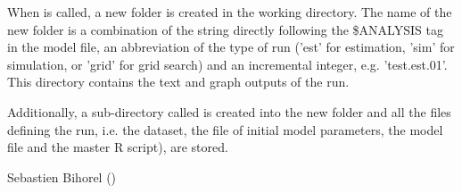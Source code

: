 %
\begin{Value}
When  is called, a new folder is created in the 
working directory. The name of the new folder is a combination of the string
directly following the \$ANALYSIS tag in the model file, an abbreviation of the
type of run ('est' for estimation, 'sim' for simulation, or 'grid' for grid 
search) and an incremental integer, e.g. 'test.est.01'. This directory 
contains the text and graph outputs of the run.

Additionally, a sub-directory called  is created into
the new folder and all the files defining the run, i.e. the dataset, the file 
of initial model parameters, the model file and the master R script), are
stored.
\end{Value}
%
\begin{Author}\relax
Sebastien Bihorel ()
\end{Author}
%
\begin{SeeAlso}\relax
{}
\end{SeeAlso}
